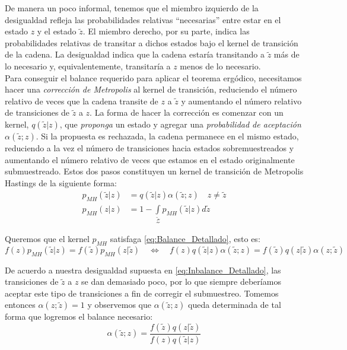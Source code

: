 De manera un poco informal, tenemos que el miembro izquierdo de la desigualdad refleja las probabilidades relativas ``necesarias'' entre estar en el estado $z$ y el estado $\tilde{z}$. El miembro derecho, por su parte, indica las probabilidades relativas de transitar a dichos estados bajo el kernel de transición de la cadena. La desigualdad indica que la cadena estaría transitando a $\tilde{z}$ más de lo necesario y, equivalentemente, transitaría a $z$ menos de lo necesario.\\ 

Para conseguir el balance requerido para aplicar el teorema ergódico, necesitamos hacer una \textit{corrección de Metropolis} al kernel de transición, reduciendo el número relativo de veces que la cadena transite de $z$ a $\tilde{z}$ y aumentando el número relativo de transiciones de $\tilde{z}$ a $z$. La forma de hacer la corrección es comenzar con un kernel, $q(\tilde{z}|z)$, que \textit{proponga} un estado y agregar una \textit{probabilidad de aceptación} $\alpha(\tilde{z};z)$. Si la propuesta es rechazada, la cadena permanece en el mismo estado, reduciendo a la vez el número de transiciones hacia estados sobremuestreados y aumentando el número relativo de veces que estamos en el estado originalmente submuestreado. Estos dos pasos constituyen un kernel de transición de Metropolis Hastings de la siguiente forma: 
\begin{align*}
p_{\scriptscriptstyle{MH}}(\tilde{z}|z) &= q(\tilde{z}|z)\alpha(\tilde{z};z) \quad z \neq \tilde{z} \\
p_{\scriptscriptstyle{MH}}(z|z) &= 1 - \int\limits_{\tilde{\mathcal{Z}}} p_{\scriptscriptstyle{MH}}(\tilde{z}|z)d\tilde{z}
\end{align*}

Queremos que el kernel $p_{\scriptscriptstyle{MH}}$ satisfaga \eqref{eq:Balance_Detallado}, esto es:
\begin{equation*}
f(z)p_{\scriptscriptstyle{MH}}(\tilde{z}|z)=f(\tilde{z})p_{\scriptscriptstyle{MH}}(z|\tilde{z}) \quad \Leftrightarrow \quad f(z)q(\tilde{z}|z)\alpha(\tilde{z};z)=f(\tilde{z})q(z|\tilde{z})\alpha(z;\tilde{z}) 
\end{equation*}

De acuerdo a nuestra desigualdad supuesta en \eqref{eq:Inbalance_Detallado}, las transiciones de $\tilde{z}$ a $z$ se dan demasiado poco, por lo que siempre deberíamos aceptar este tipo de transiciones a fin de corregir el submuestreo. Tomemos entonces $\alpha(z;\tilde{z}) = 1$ y observemos que $\alpha(\tilde{z};z)$ queda determinada de tal forma que logremos el balance necesario: 
\begin{equation*}
\alpha(\tilde{z};z)=\dfrac{f(\tilde{z})q(z|\tilde{z})}{f(z)q(\tilde{z}|z)}
\end{equation*}

